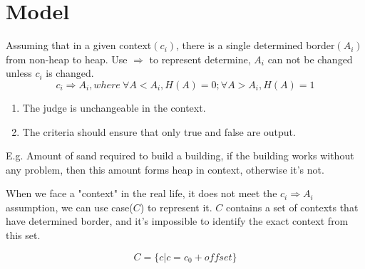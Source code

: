 \documentclass{article}
\begin{document}
\section{Model}

Assuming that in a given context$(c_i)$, there is a single determined border$(A_i)$ from non-heap to heap. Use $\Rightarrow$ to represent determine, $A_i$ can not be changed unless $c_i$ is changed.
\[c_i\Rightarrow A_i, where\ \forall A<A_i,H(A)=0;\forall A>A_i,H(A)=1\]

\begin{enumerate}
\item The judge is unchangeable in the context.
\item The criteria should ensure that only true and false are output.
\end{enumerate}

E.g. Amount of sand required to build a building, if the building works without any problem, then this amount forms heap in context, otherwise it's not.

When we face a "context" in the real life, it does not meet the $c_i\Rightarrow A_i$ assumption, we can use case($C$) to represent it. $C$ contains a set of contexts that have determined border, and it's impossible to identify the exact context from this set.

\[C=\{c|c=c_0+offset\}\]
\end{document}
